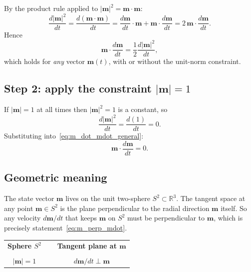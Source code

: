 \documentclass[11pt,a4paper]{article}
\newcommand{\mb}[1]{\mathbf{#1}}
\begin{document}
By the product rule applied to $|\mb{m}|^2 = \mb{m}\cdot\mb{m}$:
%
\begin{equation}
\frac{d|\mb{m}|^2}{dt}
    = \frac{d(\mb{m}\cdot\mb{m})}{dt}
    = \frac{d\mb{m}}{dt}\cdot\mb{m}
        + \mb{m}\cdot\frac{d\mb{m}}{dt}
    = 2\,\mb{m}\cdot\frac{d\mb{m}}{dt}.
\end{equation}
%
Hence
%
\begin{equation}\label{eq:m_dot_mdot_general}
\mb{m}\cdot\frac{d\mb{m}}{dt}
    = \frac{1}{2}\frac{d|\mb{m}|^2}{dt},
\end{equation}
%
which holds for \emph{any} vector $\mb{m}(t)$, with or without the
unit-norm constraint.

\subsection*{Step 2: apply the constraint $|\mb{m}| = 1$}

If $|\mb{m}| = 1$ at all times then $|\mb{m}|^2 = 1$ is a constant,
so
%
\begin{equation}
\frac{d|\mb{m}|^2}{dt} = \frac{d(1)}{dt} = 0.
\end{equation}
%
Substituting into~\eqref{eq:m_dot_mdot_general}:
%
\begin{equation}\label{eq:m_perp_mdot}
\boxed{\;
\mb{m}\cdot\frac{d\mb{m}}{dt} = 0.
\;}
\end{equation}

\subsection*{Geometric meaning}

The state vector $\mb{m}$ lives on the unit two-sphere
$S^2 \subset \mathbb{R}^3$. The tangent space at any point
$\mb{m} \in S^2$ is the plane perpendicular to the radial direction
$\mb{m}$ itself. So any velocity $d\mb{m}/dt$ that keeps $\mb{m}$ on
$S^2$ must be perpendicular to $\mb{m}$, which is precisely
statement~\eqref{eq:m_perp_mdot}.

\begin{center}
\begin{tabular}{ccc}
\textbf{Sphere $S^2$} & $\;$ & \textbf{Tangent plane at $\mb{m}$} \\
                     &      &                                 \\
$|\mb{m}| = 1$       &      & $d\mb{m}/dt \perp \mb{m}$       \\
\end{tabular}
\end{center}
\end{document}
